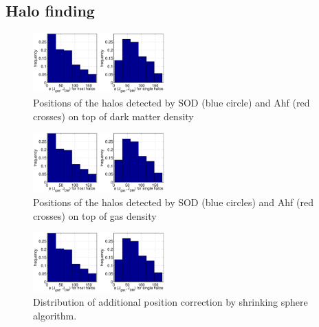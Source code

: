 \documentclass[useAMS,usenatbib]{mn2e}
\begin{document}
\subsection{Halo finding}
\begin{figure}
  \begin{center}
    \includegraphics[width=0.45\textwidth]{fig/a.eps}%
  \end{center}
  \caption{\label{fig:vis_proj_dm_sod_ahf}Positions of the halos detected by SOD (blue circle) and {\sc Ahf} (red crosses) on top of dark matter density}
\end{figure}


\begin{figure}
  \begin{center}
    \includegraphics[width=0.45\textwidth]{fig/a.eps}%
  \end{center}
  \caption{\label{fig:vis_proj_gas_sod_ahf}Positions of the halos detected by SOD (blue circles) and {\sc Ahf} (red crosses) on top of gas density}
\end{figure}

\begin{figure}
  \begin{center}
    \includegraphics[width=0.45\textwidth]{fig/a.eps}%
  \end{center}
  \caption{\label{fig:hist_shrsph}Distribution of additional position correction by shrinking sphere algorithm.}
\end{figure}
\end{document}
